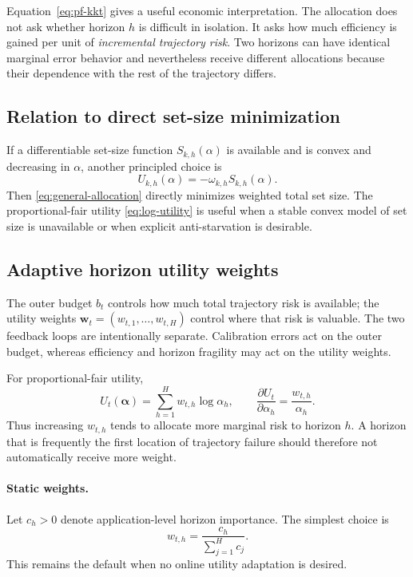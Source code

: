 \documentclass[11pt]{article}
\begin{document}
Equation~\eqref{eq:pf-kkt} gives a useful economic interpretation. The allocation does not ask whether horizon $h$ is difficult in isolation. It asks how much efficiency is gained per unit of \emph{incremental trajectory risk}. Two horizons can have identical marginal error behavior and nevertheless receive different allocations because their dependence with the rest of the trajectory differs.

\subsection{Relation to direct set-size minimization}

If a differentiable set-size function $S_{k,h}(\alpha)$ is available and is convex and decreasing in $\alpha$, another principled choice is
\[
    U_{k,h}(\alpha)=-\omega_{k,h}S_{k,h}(\alpha).
\]
Then \eqref{eq:general-allocation} directly minimizes weighted total set size. The proportional-fair utility \eqref{eq:log-utility} is useful when a stable convex model of set size is unavailable or when explicit anti-starvation is desirable.

\subsection{Adaptive horizon utility weights}
\label{sec:adaptive-utility-weights}

The outer budget $b_t$ controls how much total trajectory risk is available;
the utility weights $\bm w_t=(w_{t,1},\ldots,w_{t,H})$ control where that risk is
valuable.  The two feedback loops are intentionally separate.  Calibration
errors act on the outer budget, whereas efficiency and horizon fragility may
act on the utility weights.

For proportional-fair utility,
\[
    U_t(\bm\alpha)
    =
    \sum_{h=1}^H w_{t,h}\log\alpha_h,
    \qquad
    \frac{\partial U_t}{\partial\alpha_h}
    =
    \frac{w_{t,h}}{\alpha_h}.
\]
Thus increasing $w_{t,h}$ tends to allocate more marginal risk to horizon $h$.
A horizon that is frequently the first location of trajectory failure should
therefore not automatically receive more weight.

\paragraph{Static weights.}
Let $c_h>0$ denote application-level horizon importance.  The simplest choice is
\begin{equation}
    w_{t,h}
    =
    \frac{c_h}{\sum_{j=1}^H c_j}.
    \label{eq:static-utility-weights}
\end{equation}
This remains the default when no online utility adaptation is desired.
\end{document}
